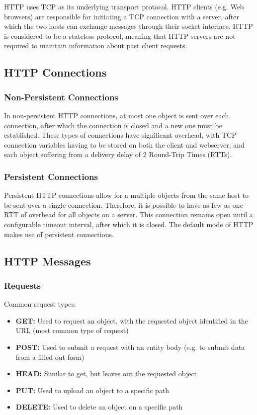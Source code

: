 \documentclass[12pt,titlepage]{article}
\begin{document}
      HTTP uses TCP as its underlying transport protocol. HTTP clients (e.g. Web browsers) are responsible for initiating a TCP connection with a server, after which the two hosts
      can exchange messages through their socket interface. HTTP is considered to be a stateless protocol, meaning that HTTP servers are not required to maintain information about
      past client requests.

    \subsection{HTTP Connections}

      \subsubsection{Non-Persistent Connections}
        In non-persistent HTTP connections, at most one object is sent over each connection, after which the connection is closed and a new one must be established. These types of
        connections have significant overhead, with TCP connection variables having to be stored on both the client and webserver, and each object suffering from a delivery delay
        of 2 Round-Trip Times (RTTs).

      \subsubsection{Persistent Connections}
        Persistent HTTP connections allow for a multiple objects from the same host to be sent over a single connection. Therefore, it is possible to have as few as one RTT of
        overhead for all objects on a server. This connection remains open until a configurable timeout interval, after which it is closed. The default mode of HTTP makes use
        of persistent connections.

    \subsection{HTTP Messages}

      \subsubsection{Requests}
        Common request types:
        \begin{itemize}
          \item \textbf{GET:} Used to request an object, with the requested object identified in the URL (most common type of request)
          \item \textbf{POST:} Used to submit a request with an entity body (e.g. to submit data from a filled out form)
          \item \textbf{HEAD:} Similar to get, but leaves out the requested object
          \item \textbf{PUT:} Used to upload an object to a specific path
          \item \textbf{DELETE:} Used to delete an object on a specific path
        \end{itemize}
\end{document}
